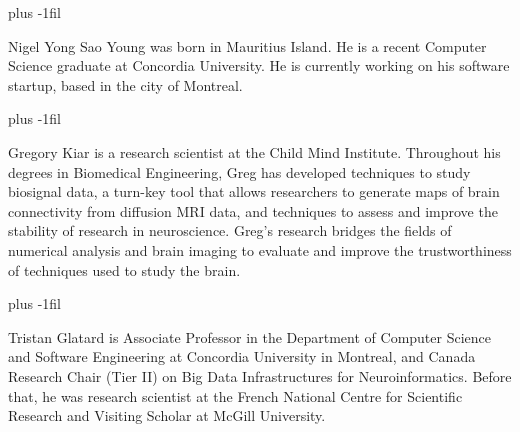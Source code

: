 \documentclass[10pt,journal,compsoc]{IEEEtran}
\begin{document}
\baselineskip plus -1fil
\begin{IEEEbiography}{Nigel
        Yong Sao Young} was born in Mauritius Island. He is a recent Computer
    Science graduate at Concordia University. He is currently working on his
    software startup, based in the city of Montreal.
\end{IEEEbiography}

\baselineskip plus -1fil
\begin{IEEEbiography}{Gregory
        Kiar} is a research scientist at the Child Mind Institute. Throughout his
    degrees in Biomedical Engineering, Greg has developed techniques to study
    biosignal data, a turn-key tool that allows researchers to generate maps of
    brain connectivity from diffusion MRI data, and techniques to assess and
    improve the stability of research in neuroscience. Greg’s research bridges
    the fields of numerical analysis and brain imaging to evaluate and improve
    the trustworthiness of techniques used to study the brain. 
\end{IEEEbiography}

\baselineskip plus -1fil
\begin{IEEEbiography}{Tristan
        Glatard} is Associate Professor in the Department of Computer Science and
    Software Engineering at Concordia University in Montreal, and Canada
    Research Chair (Tier II) on Big Data Infrastructures for Neuroinformatics.
    Before that, he was research scientist at the French National Centre for
    Scientific Research and Visiting Scholar at McGill University. 
\end{IEEEbiography}
\end{document}
